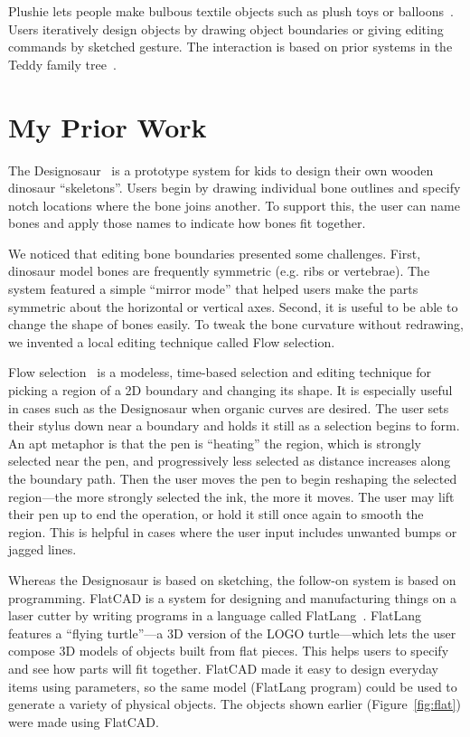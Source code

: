 \documentclass[11pt]{article}
\begin{document}
Plushie lets people make bulbous textile objects such as plush toys or
balloons~\cite{mori-plushie}. Users iteratively design objects by
drawing object boundaries or giving editing commands by sketched
gesture. The interaction is based on prior systems in the Teddy family
tree~\cite{igarashi-teddy}.

\section{My Prior Work}

The Designosaur~\cite{oh-fab} is a prototype system for kids to design
their own wooden dinosaur ``skeletons''. Users begin by drawing
individual bone outlines and specify notch locations where the bone
joins another. To support this, the user can name bones and apply
those names to indicate how bones fit together.

We noticed that editing bone boundaries presented some challenges.
First, dinosaur model bones are frequently symmetric (e.g. ribs or
vertebrae). The system featured a simple ``mirror mode'' that helped
users make the parts symmetric about the horizontal or vertical axes.
Second, it is useful to be able to change the shape of bones
easily. To tweak the bone curvature without redrawing, we invented a
local editing technique called Flow selection.

Flow selection~\cite{johnson-flow-selection} is a modeless, time-based
selection and editing technique for picking a region of a 2D boundary
and changing its shape. It is especially useful in cases such as the
Designosaur when organic curves are desired. The user sets their
stylus down near a boundary and holds it still as a selection begins
to form. An apt metaphor is that the pen is ``heating'' the region,
which is strongly selected near the pen, and progressively less
selected as distance increases along the boundary path. Then the user
moves the pen to begin reshaping the selected region---the more
strongly selected the ink, the more it moves. The user may lift their
pen up to end the operation, or hold it still once again to smooth the
region. This is helpful in cases where the user input includes
unwanted bumps or jagged lines.

Whereas the Designosaur is based on sketching, the follow-on system is
based on programming. FlatCAD is a system for designing and
manufacturing things on a laser cutter by writing programs in a
language called FlatLang~\cite{johnson-flatcad}.  FlatLang features a
``flying turtle''---a 3D version of the LOGO turtle---which lets the
user compose 3D models of objects built from flat pieces. This helps
users to specify and see how parts will fit together. FlatCAD made it
easy to design everyday items using parameters, so the same model
(FlatLang program) could be used to generate a variety of physical
objects. The objects shown earlier (Figure~\ref{fig:flat}) were made
using FlatCAD.
\end{document}
